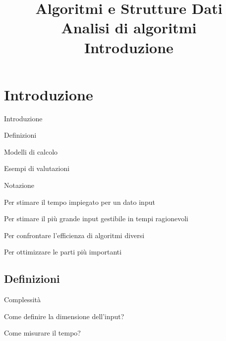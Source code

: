 

\usepackage{epigraph}

\title[ASD - Analisi di algoritmi]{\textbf{Algoritmi e Strutture Dati}\\[12pt]Analisi di algoritmi\\Introduzione}

\graphicspath{{figs/02/}}




\FrameTitle{}

\FrameContent

\section{Introduzione}

\begin{frame}{Introduzione}

\vspace{-9pt}
\begin{myboxtitle}
\BIL
\item Definizioni
\item Modelli di calcolo
\item Esempi di valutazioni
\item Notazione
\EIL
\end{myboxtitle}

\begin{myboxtitle}[Perché?]
\BI
\item Per stimare il tempo impiegato per un dato input
\item Per stimare il più grande input gestibile in tempi ragionevoli
\item Per confrontare l'efficienza di algoritmi diversi
\item Per ottimizzare le parti più importanti
\EI
\end{myboxtitle}
\end{frame}



\subsection{Definizioni}

\begin{frame}{Complessità}

\vspace{-9pt}
\begin{myboxtitle}
\BI
\item Come definire la dimensione dell'input?
\item Come misurare il tempo?
\EI
\end{myboxtitle}

\end{frame}


